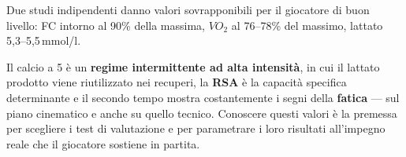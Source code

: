 Due studi indipendenti danno valori sovrapponibili per il giocatore di buon livello: FC intorno al
90\% della massima, $VO_2$ al 76--78\% del massimo, lattato 5,3--5,5\,mmol/l.

Il calcio a 5 è un \textbf{regime intermittente ad alta intensità}, in cui il lattato prodotto viene
riutilizzato nei recuperi, la \textbf{RSA} è la capacità specifica determinante e il secondo tempo
mostra costantemente i segni della \textbf{fatica} --- sul piano cinematico e anche su quello
tecnico. Conoscere questi valori è la premessa per scegliere i test di valutazione e per parametrare
i loro risultati all'impegno reale che il giocatore sostiene in partita.
